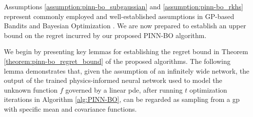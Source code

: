 Assumptions \ref{assumption:pinn-bo_subgaussian} and \ref{assumption:pinn-bo_rkhs} represent commonly employed and well-established assumptions in GP-based Bandits and Bayesian Optimization \citep{chowdhury2017kernelized,vakili2021optimal}. We are now prepared to establish an upper bound on the regret incurred by our proposed PINN-BO algorithm.  

We begin by presenting key lemmas for establishing the regret bound in Theorem \ref{theorem:pinn-bo_regret_bound} of the proposed algorithms. The following lemma demonstrates that, given the assumption of an infinitely wide network, the output of the trained physics-informed neural network used to model the unknown function $f$ governed by a linear \ac{pde}, after running $t$ optimization iterations in Algorithm \ref{alg:PINN-BO}, can be regarded as sampling from a \ac{gp} with specific mean and covariance functions.
